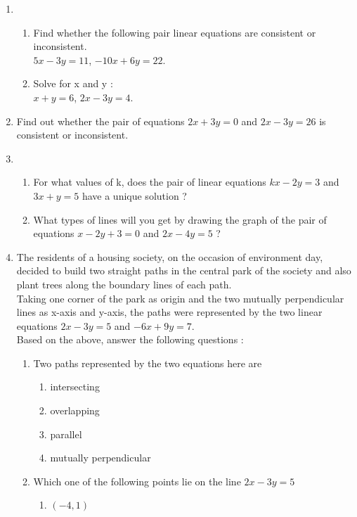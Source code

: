 \begin{enumerate}
\item 
\begin{enumerate}
    \item Find whether the following pair linear equations are consistent or 
inconsistent.\\
$5x-3y=11$, $-10x+6y=22$.


    \item Solve for x and y : \\
    $x+y=6$, $2x-3y=4$.
 \end{enumerate}
 \item Find out whether the pair of equations $2x+3y=0$ and $2x-3y=26$ is consistent or inconsistent.
\item 
\begin{enumerate}
    \item For what values of k, does the pair of linear equations $kx-2y=3$ and $3x+y=5$ have a unique solution ?
    \item What types of lines will you get by drawing the graph of the pair of equations $x-2y+3=0$ and $2x-4y=5$ ?
\end{enumerate}
\item The residents of a housing society, on the occasion of environment day, decided to build two straight paths in the central park of the society and also plant trees along the boundary lines of each path.\\
Taking one corner of the park as origin and the two mutually perpendicular lines as x-axis and y-axis, the paths were represented by the two linear equations $2x-3y=5$ and $-6x+9y=7$.\\
Based on the above, answer the following questions :
 \begin{enumerate}[label=(\roman*)]
 \item Two paths represented by the two equations here are 
  \begin{enumerate}[label=(\Alph*)]
             \item intersecting
             \item overlapping
             \item parallel
             \item mutually perpendicular
    \end{enumerate}
\item Which one of the following points lie on the line $2x-3y=5$
\begin{enumerate}[label=(\Alph*)]
             \item $\left( -4,1 \right)$

\end{enumerate}
\end{enumerate}
\end{enumerate}

